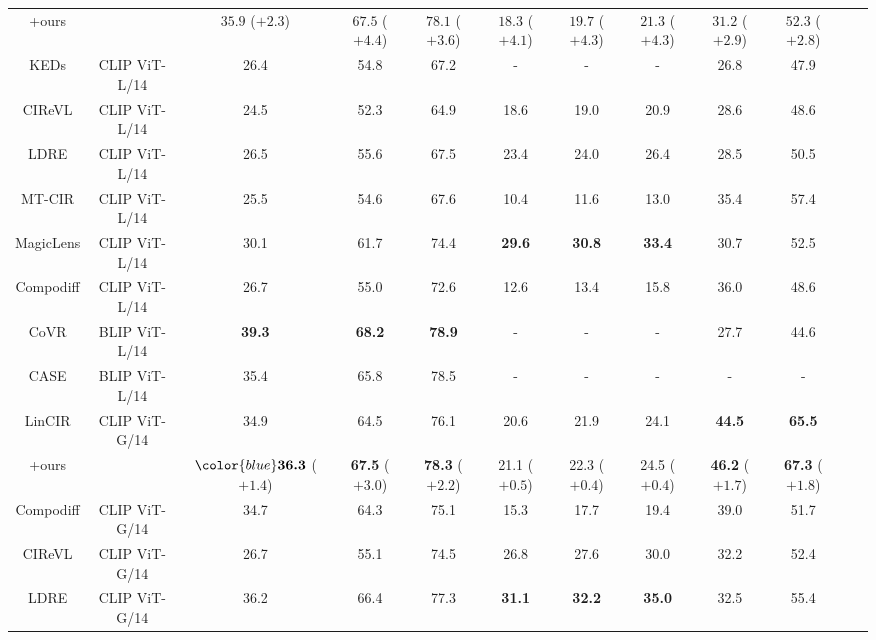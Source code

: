 \begin{table}[ht]
{\begin{tabular}{c|ccccccccccc}
    \rowcolor{gray!20} +ours &  & $35.9$ \color{violet}($\mathbf{+2.3}$) & \color{blue} $\mathbf{67.5}$ \color{violet}($\mathbf{+4.4}$) & $78.1$ \color{violet}($\mathbf{+3.6}$) & $18.3$ \color{violet}($\mathbf{+4.1}$) & $19.7$ \color{violet}($\mathbf{+4.3}$) & $21.3$ \color{violet}($\mathbf{+4.3}$)   & $31.2$ \color{violet}($\mathbf{+2.9}$) & $52.3$ \color{violet}($\mathbf{+2.8}$)   \\
     KEDs \citep{KEDs} & CLIP ViT-L/14  & 26.4 & 54.8 & 67.2 & - & - & - & 26.8 & 47.9  \\
     CIReVL \citep{cirevl}  & CLIP ViT-L/14  & 24.5 & 52.3 & 64.9 &18.6 &19.0 & 20.9  & 28.6 & 48.6  \\
    LDRE \citep{ldre}  & CLIP ViT-L/14  & 26.5 & 55.6 & 67.5 &23.4 &24.0 & 26.4  & 28.5 & 50.5  \\
    MT-CIR \citep{mtcir} & CLIP ViT-L/14  & 25.5 & 54.6 & 67.6 & 10.4 & 11.6 & 13.0  & 35.4 & 57.4  \\
    MagicLens \citep{magiclens} & CLIP ViT-L/14   & 30.1 & 61.7 & 74.4 & \color{blue} \textbf{29.6} & \color{blue} \textbf{30.8} & \color{blue} \textbf{33.4}  & 30.7 & 52.5  \\
    Compodiff \citep{compodiff} & CLIP ViT-L/14   & 26.7 & 55.0 & 72.6 & 12.6 &13.4 & 15.8  & 36.0 & 48.6  \\
    CoVR \citep{covr} & BLIP ViT-L/14  & \color{red} \textbf{39.3} & \color{red} \textbf{68.2} & \color{red} \textbf{78.9} & - & - & - & 27.7 & 44.6  \\
    CASE \citep{(CASE)levy2024data} & BLIP ViT-L/14  & 35.4 & 65.8 & 78.5 & - & - & - & - & -  \\
        \midrule
    LinCIR \citep{lincir}  & CLIP ViT-G/14  & 34.9 & 64.5 & 76.1 & 20.6 &21.9 & 24.1  & \color{blue}\textbf{44.5} & \color{red}\textbf{65.5}  \\
     \rowcolor{gray!20} +ours  &  & $\color{blue} \textbf{36.3}$ \color{violet}($\mathbf{+1.4}$) & \color{blue} \textbf{67.5} \color{violet}($\mathbf{+3.0}$)  & \color{blue} \textbf{78.3} \color{violet}($\mathbf{+2.2}$) & 21.1 \color{violet}($\mathbf{+0.5}$) &22.3 \color{violet}($\mathbf{+0.4}$) & 24.5 \color{violet}($\mathbf{+0.4}$)  & \color{red}\textbf{46.2} \color{violet}($\mathbf{+1.7}$) & \color{red}\textbf{67.3} \color{violet}($\mathbf{+1.8}$)  \\
     Compodiff \citep{cirevl}  & CLIP ViT-G/14  & 34.7 & 64.3 & 75.1 & 15.3 &17.7 & 19.4 & 39.0 & 51.7  \\
     CIReVL \citep{cirevl}  & CLIP ViT-G/14  & 26.7 & 55.1 & 74.5 & 26.8 &27.6 & 30.0  & 32.2 & 52.4  \\
     LDRE \citep{ldre}  & CLIP ViT-G/14  & 36.2 & 66.4 & 77.3 & \color{red} \textbf{31.1} & \color{red}  \textbf{32.2} &\color{red}  \textbf{35.0}  & 32.5 & 55.4  \\
    \bottomrule
\end{tabular}
    }
    \label{tab:appendix_comparison}
    \vspace{-0.45cm}
\end{table}

